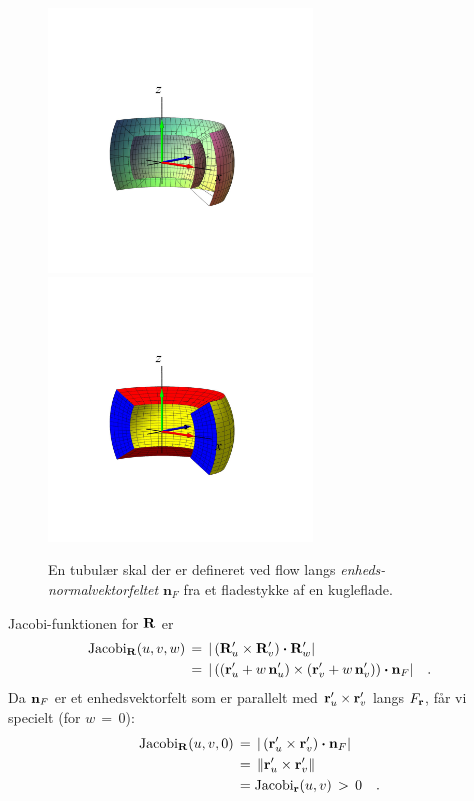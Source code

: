 \begin{figure}[h]
\centerline{\includegraphics[height=70mm]{FIGS/plotNormalSphFlow} \includegraphics[height=70mm]{FIGS/plotNormalSphFlowSolid}}
\begin{center}
\caption{En tubulær skal der er defineret ved flow langs  \emph{enheds-normalvektorfeltet} $\mathbf{n}_{F}$
fra et
fladestykke af en kugleflade.} \label{figShell12B}
\end{center}
\end{figure}





Jacobi-funktionen for  ${\bf{R}}$ er
\begin{equation} \label{eqFatJac}
\begin{aligned}
\operatorname{Jacobi}_{{\bf{R}}}(u,v,w) \, &= \, |\left(
{\bf{R}}'_{u} \times {\bf{R}}'_{v}\right)\bm{\cdot}
{\bf{R}}'_{w}| \\ &= \, |\left( ({\bf{r}}'_{u} +
w\,{\bf{n}}'_{u} ) \times ({\bf{r}}'_{v}+ w\,
{\bf{n}}'_{v})\right)\bm{\cdot} {\bf{n}}_{F}| \quad .
\end{aligned}
\end{equation}
Da ${\bf{n}}_{F}$ er et enhedsvektorfelt som er
parallelt med ${\bf{r}}'_{u} \times
{\bf{r}}'_{v}$ langs $F_{\bf{r}}$, får vi
specielt (for $w\, = \, 0$):
\begin{equation} \label{eqFatJac0}
\begin{aligned}
\operatorname{Jacobi}_{{\bf{R}}}(u,v,0) \, &= \,
|\left({\bf{r}}'_{u} \times
{\bf{r}}'_{v}\right)\bm{\cdot} {\bf{n}}_{F}|
\\ &=  \, \Vert {\bf{r}}'_{u} \times
{\bf{r}}'_{v} \Vert   \\ &= \operatorname{Jacobi}_{{\bf{r}}}(u,v)
\, > \, 0 \quad .
\end{aligned}
\end{equation}


